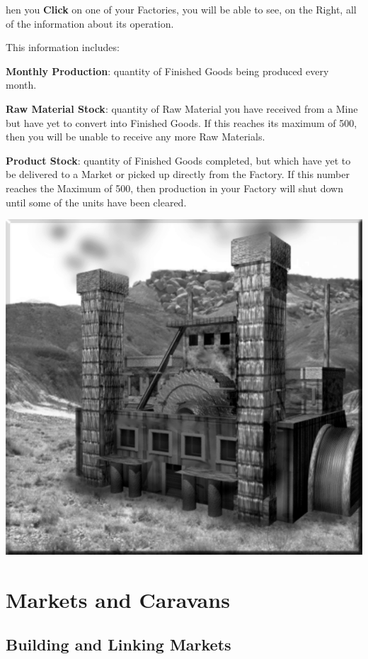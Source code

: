 hen you \textbf{Click} on one of your Factories, you will be able to see, on the Right, all of the information about its operation.


This information includes:

\textbf{Monthly Production}: quantity of Finished Goods being produced every month.

\textbf{Raw Material Stock}: quantity of Raw Material you have received from a Mine but have yet to convert into Finished Goods. If this reaches its maximum of 500, then you will be unable to receive any more Raw Materials.


\textbf{Product Stock}: quantity of Finished Goods completed, but which have yet to be delivered to a Market or picked up directly from the Factory. If this number reaches the Maximum of 500, then production in your Factory will shut down until some of the units have been cleared.

\begin{center}
    \includegraphics[width=0.45\linewidth]{Afactory} %
\end{center}


\section{\textsf{Markets and Caravans}}


\subsection{\textsf{Building and Linking Markets}}


